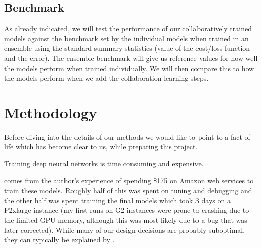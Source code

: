\documentclass[english,a4paper,oneside]{amsart}
\theoremstyle{definition}
\begin{document}
\subsection{Benchmark}

As already indicated, we will test the performance of our collaboratively trained models against the benchmark set by the individual models when trained in an ensemble using the standard summary statistics (value of the cost/loss function and the error).  The ensemble benchmark will give us reference values for how well the models perform when trained individually. We will then compare this to how the models perform when we add the collaboration learning steps.


\section{Methodology}
Before diving into the details of our methods we would like to point to a fact of life which has become clear to us, while preparing this project. 
\begin{axiom}\label{ouraxiom}
	Training deep neural networks is time consuming and expensive. 
\end{axiom}

 comes from the author's experience of spending \$175 on Amazon web services to train these models. Roughly half of this was spent on tuning and debugging and the other half was spent training the final models which took 3 days on a P2xlarge instance (my first runs on G2 instances were prone to crashing due to the limited GPU memory, although this was most likely due to a bug that was later corrected). While many of our design decisions are probably suboptimal, they can typically be explained by .
\end{document}
